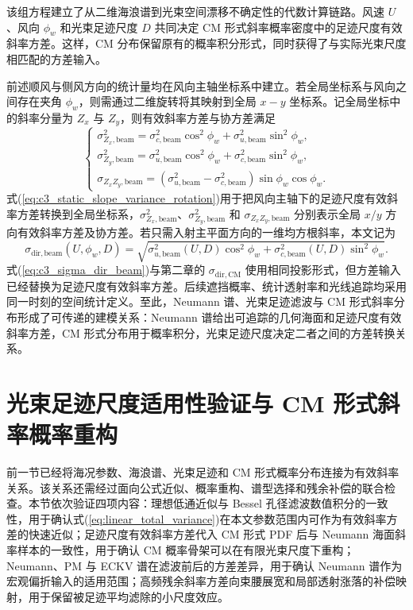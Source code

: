 该组方程建立了从二维海浪谱到光束空间漂移不确定性的代数计算链路。风速 $U$、风向 $\phi_w$ 和光束足迹尺度 $D$ 共同决定 CM 形式斜率概率密度中的足迹尺度有效斜率方差。这样，CM 分布保留原有的概率积分形式，同时获得了与实际光束尺度相匹配的方差输入。

前述顺风与侧风方向的统计量均在风向主轴坐标系中建立。若全局坐标系与风向之间存在夹角 $\phi_w$，则需通过二维旋转将其映射到全局 $x-y$ 坐标系。记全局坐标中的斜率分量为 $Z_x$ 与 $Z_y$，则有效斜率方差与协方差满足
\begin{equation}
	\begin{cases}
		\sigma_{Z_x,\mathrm{beam}}^2 =
		\sigma_{c,\mathrm{beam}}^2\cos^2\phi_w
		+
		\sigma_{u,\mathrm{beam}}^2\sin^2\phi_w,\\
		\sigma_{Z_y,\mathrm{beam}}^2 =
		\sigma_{u,\mathrm{beam}}^2\cos^2\phi_w
		+
		\sigma_{c,\mathrm{beam}}^2\sin^2\phi_w,\\
		\sigma_{Z_xZ_y,\mathrm{beam}} =
		\left(\sigma_{u,\mathrm{beam}}^2-\sigma_{c,\mathrm{beam}}^2\right)
		\sin\phi_w\cos\phi_w .
	\end{cases}
	\label{eq:c3_static_slope_variance_rotation}
\end{equation}
式(\ref{eq:c3_static_slope_variance_rotation})用于把风向主轴下的足迹尺度有效斜率方差转换到全局坐标系，$\sigma_{Z_x,\mathrm{beam}}^2$、$\sigma_{Z_y,\mathrm{beam}}^2$ 和 $\sigma_{Z_xZ_y,\mathrm{beam}}$ 分别表示全局 $x/y$ 方向有效斜率方差及协方差。若只需入射主平面方向的一维均方根斜率，本文记为
\begin{equation}
	\sigma_{\mathrm{dir},\mathrm{beam}}(U,\phi_w,D)=
	\sqrt{\sigma_{u,\mathrm{beam}}^2(U,D)\cos^2\phi_w+\sigma_{c,\mathrm{beam}}^2(U,D)\sin^2\phi_w}.
	\label{eq:c3_sigma_dir_beam}
\end{equation}
式(\ref{eq:c3_sigma_dir_beam})与第二章的 $\sigma_{\mathrm{dir},\mathrm{CM}}$ 使用相同投影形式，但方差输入已经替换为足迹尺度有效斜率方差。后续遮挡概率、统计透射率和光线追踪均采用同一时刻的空间统计定义。至此，Neumann 谱、光束足迹滤波与 CM 形式斜率分布形成了可传递的建模关系：Neumann 谱给出可追踪的几何海面和足迹尺度有效斜率方差，CM 形式分布用于概率积分，光束足迹尺度决定二者之间的方差转换关系。

\section{光束足迹尺度适用性验证与 CM 形式斜率概率重构}
\label{sec:scale_applicability_and_validation}

前一节已经将海况参数、海浪谱、光束足迹和 CM 形式概率分布连接为有效斜率关系。该关系还需经过面向公式近似、概率重构、谱型选择和残余补偿的联合检查。本节依次验证四项内容：理想低通近似与 Bessel 孔径滤波数值积分的一致性，用于确认式(\ref{eq:linear_total_variance})在本文参数范围内可作为有效斜率方差的快速近似；足迹尺度有效斜率方差代入 CM 形式 PDF 后与 Neumann 海面斜率样本的一致性，用于确认 CM 概率骨架可以在有限光束尺度下重构；Neumann、PM 与 ECKV 谱在滤波前后的方差差异，用于确认 Neumann 谱作为宏观偏折输入的适用范围；高频残余斜率方差向束腰展宽和局部透射涨落的补偿映射，用于保留被足迹平均滤除的小尺度效应。

